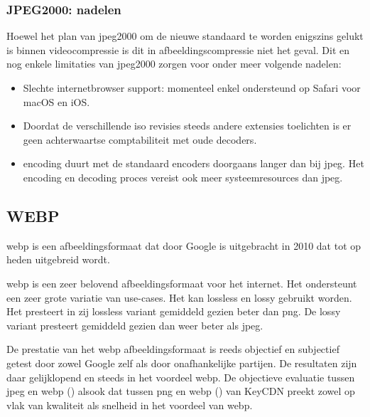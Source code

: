 \subsubsection{JPEG2000: nadelen}
\label{sec:afbeeldingscompressie-jpeg2000-nadelen}

Hoewel het plan van \gls{jpeg2000} om de nieuwe standaard te worden enigszins gelukt is binnen \gls{videocompressie} is dit in \gls{afbeeldingscompressie} niet het geval. Dit en nog enkele limitaties van \gls{jpeg2000} zorgen voor onder meer volgende nadelen:

\begin{itemize}
	\item Slechte internetbrowser support: momenteel enkel ondersteund op Safari voor macOS en iOS. 
	
	\item Doordat de verschillende \gls{iso} revisies steeds andere \glspl{extensie} toelichten is er geen achterwaartse comptabiliteit met oude \glspl{decoder}.
	
	\item \Gls{encoding} duurt met de standaard \glspl{encoder} doorgaans langer dan bij \gls{jpeg}. Het \gls{encoding} en \gls{decoding} proces vereist ook meer systeemresources dan \gls{jpeg}.
\end{itemize}

\subsection{WEBP}
\label{sec:afbeeldingscompressie-webp}

\Gls{webp} is een \gls{afbeeldingsformaat} dat door Google is uitgebracht in 2010 dat tot op heden uitgebreid wordt. 
 
\Gls{webp} is een zeer belovend \gls{afbeeldingsformaat} voor het internet. Het ondersteunt een zeer grote variatie van \glspl{use-case}. Het kan \gls{lossless} en \gls{lossy} gebruikt worden. Het presteert in zij \gls{lossless} variant gemiddeld gezien beter dan \gls{png}. De \gls{lossy} variant presteert gemiddeld gezien dan weer beter als \gls{jpeg}.

De prestatie van het \gls{webp} \gls{afbeeldingsformaat} is reeds objectief en subjectief getest door zowel Google zelf als door onafhankelijke partijen. De resultaten zijn daar gelijklopend en steeds in het voordeel \gls{webp}. De objectieve evaluatie tussen \gls{jpeg} en \gls{webp} (\cite{jpegwebp}) alsook dat tussen \gls{png} en \gls{webp} (\cite{pngwebp}) van KeyCDN preekt zowel op vlak van kwaliteit als snelheid in het voordeel van \gls{webp}.

